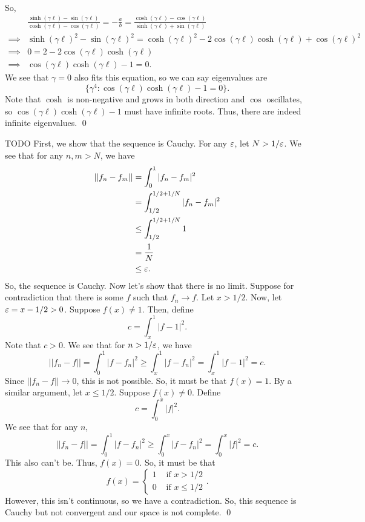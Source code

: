 \documentclass{article}
\begin{document}
\begin{enumerate}[(a)]
\begin{align*}
    \end{align*}
    So, 
    \begin{align*}
        &\frac{\sinh(\gamma\ell)-\sin(\gamma\ell)}{\cosh(\gamma\ell)-\cos(\gamma\ell)} = -\frac{a}{b} = \frac{\cosh(\gamma\ell)-\cos(\gamma\ell)}{\sinh(\gamma\ell)+\sin(\gamma\ell)} \\
        \implies& \sinh(\gamma\ell)^2 -\sin(\gamma\ell)^2 = \cosh(\gamma\ell)^2 - 2 \cos(\gamma\ell)\cosh(\gamma\ell) + \cos(\gamma\ell)^2 \\
        \implies& 0 = 2 - 2\cos(\gamma\ell)\cosh(\gamma\ell) \\
        \implies& \cos(\gamma\ell) \cosh(\gamma\ell) - 1 = 0.
    \end{align*}
    We see that $\gamma = 0$ also fits this equation, so we can say eigenvalues are \[\{\gamma^4:  \cos(\gamma\ell) \cosh(\gamma\ell) - 1 = 0\}.\]
    Note that $\cosh$ is non-negative and grows in both direction and $\cos$ oscillates, so $\cos(\gamma\ell) \cosh(\gamma\ell) - 1$ must have infinite roots. Thus, there are indeed infinite eigenvalues. \qed
\end{enumerate}


\newpage
{} TODO
 \tri
\hop 
\solution
First, we show that the sequence is Cauchy. For any $\varepsilon$, let $N >1/\varepsilon$. We see that for any $n, m > N$, we have
\begin{align*}
    ||f_n - f_m|| &= \int_0^1|f_n-f_m|^2 \\
    &= \int_{1/2}^{1/2+1/N}|f_n-f_m|^2 \\
    &\le \int_{1/2}^{1/2+1/N}1 \\
    &= \frac{1}{N} \\
    &\le \varepsilon.
\end{align*}
So, the sequence is Cauchy.
\hop 
Now let's show that there is no limit. Suppose for contradiction that there is some $f$ such that $f_n \to f$. Let $x > 1/2$. Now, let $\varepsilon = x - 1/2 > 0$. Suppose $f(x) \ne 1$. Then, define 
\[c = \int_x^1 |f-1|^2.\]
Note that $c >0$. We see that for $n>1/\varepsilon$, we have 
\[||f_n - f|| = \int_0^1|f-f_n|^2 \ge \int_x^1|f-f_n|^2 =\int_x^1|f-1|^2 = c.\]
Since $||f_n -f|| \to 0$, this is not possible. So, it must be that $f(x) = 1$. 
\hop 
By a similar argument, let $x \le 1/2$. Suppose $f(x) \ne 0$. Define 
\[c = \int_0^x |f|^2.\]
We see that for any $n$,
\[||f_n - f|| = \int_0^1|f-f_n|^2 \ge \int_0^x|f-f_n|^2  = \int_0^x|f|^2 = c. \]
This also can't be. Thus, $f(x) = 0$. So, it must be that 
\[f(x) = \begin{cases}
    1 &\text{ if } x > 1/2\\
    0 &\text{ if } x \le 1/2
\end{cases}.\]
However, this isn't continuous, so we have a contradiction. So, this sequence is Cauchy but not convergent and our space is not complete. \qed
\end{document}
